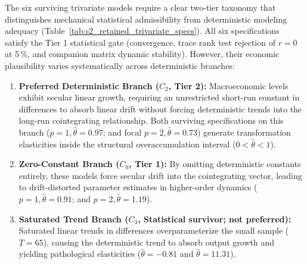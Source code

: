 The six surviving trivariate models require a clear two-tier taxonomy that distinguishes mechanical statistical admissibility from deterministic modeling adequacy (Table~\ref{tab:s2_retained_trivariate_specs}). All six specifications satisfy the Tier 1 statistical gate (convergence, trace rank test rejection of $r=0$ at 5\,\%, and companion matrix dynamic stability). However, their economic plausibility varies systematically across deterministic branches:
\begin{enumerate}[label=(\roman*)]
\item \textbf{Preferred Deterministic Branch ($C_2$, Tier 2):} Macroeconomic levels exhibit secular linear growth, requiring an unrestricted short-run constant in differences to absorb linear drift without forcing deterministic trends into the long-run cointegrating relationship. Both surviving specifications on this branch ($p=1, \hat{\theta}=0.97$; and focal $p=2, \hat{\theta}=0.73$) generate transformation elasticities inside the structural overaccumulation interval ($0 < \hat{\theta} < 1$).
\item \textbf{Zero-Constant Branch ($C_0$, Tier 1):} By omitting deterministic constants entirely, these models force secular drift into the cointegrating vector, leading to drift-distorted parameter estimates in higher-order dynamics ($p=1, \hat{\theta}=0.91$; and $p=2, \hat{\theta}=1.19$).
\item \textbf{Saturated Trend Branch ($C_3$, Statistical survivor; not preferred):} Saturated linear trends in differences overparameterize the small sample ($T=65$), causing the deterministic trend to absorb output growth and yielding pathological elasticities ($\hat{\theta} = -0.81$ and $\hat{\theta} = 11.31$).
\end{enumerate}

